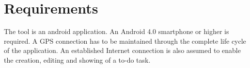 \section{Requirements}
The tool is an android application. An Android 4.0 smartphone or higher is
required. A GPS connection has to be maintained through the complete life cycle
of the application. An established Internet connection is also assumed to enable
the creation, editing and showing of a to-do task.